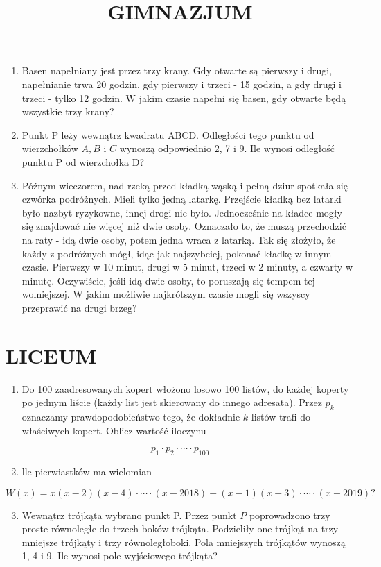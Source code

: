 \documentclass[10pt]{article}
\title{GIMNAZJUM }
\author{}
\date{}
\begin{document}
\maketitle
\begin{enumerate}
  \item Basen napełniany jest przez trzy krany. Gdy otwarte są pierwszy i drugi, napełnianie trwa 20 godzin, gdy pierwszy i trzeci - 15 godzin, a gdy drugi i trzeci - tylko 12 godzin. W jakim czasie napełni się basen, gdy otwarte będą wszystkie trzy krany?
  \item Punkt P leży wewnątrz kwadratu ABCD. Odległości tego punktu od wierzchołków \(A, B\) i \(C\) wynoszą odpowiednio 2, 7 i 9. Ile wynosi odległość punktu P od wierzchołka D?
  \item Późnym wieczorem, nad rzeką przed kładką wąską i pełną dziur spotkała się czwórka podróżnych. Mieli tylko jedną latarkę. Przejście kładką bez latarki było nazbyt ryzykowne, innej drogi nie było. Jednocześnie na kładce mogły się znajdować nie więcej niż dwie osoby. Oznaczało to, że muszą przechodzić na raty - idą dwie osoby, potem jedna wraca z latarką. Tak się złożyło, że każdy z podróżnych mógł, idąc jak najszybciej, pokonać kładkę w innym czasie. Pierwszy w 10 minut, drugi w 5 minut, trzeci w 2 minuty, a czwarty w minutę. Oczywiście, jeśli idą dwie osoby, to poruszają się tempem tej wolniejszej. W jakim możliwie najkrótszym czasie mogli się wszyscy przeprawić na drugi brzeg?
\end{enumerate}

\section*{LICEUM}
\begin{enumerate}
  \item Do 100 zaadresowanych kopert włożono losowo 100 listów, do każdej koperty po jednym liście (każdy list jest skierowany do innego adresata). Przez \(p_{k}\) oznaczamy prawdopodobieństwo tego, że dokładnie \(k\) listów trafi do właściwych kopert. Oblicz wartość iloczynu
\end{enumerate}

\[
p_{1} \cdot p_{2} \cdot \cdots \cdot p_{100}
\]

\begin{enumerate}
  \setcounter{enumi}{1}
  \item lle pierwiastków ma wielomian
\end{enumerate}

\[
W(x)=x(x-2)(x-4) \cdot \cdots \cdot(x-2018)+(x-1)(x-3) \cdot \cdots \cdot(x-2019) ?
\]

\begin{enumerate}
  \setcounter{enumi}{2}
  \item Wewnątrz trójkąta wybrano punkt P. Przez punkt \(P\) poprowadzono trzy proste równoległe do trzech boków trójkąta. Podzieliły one trójkąt na trzy mniejsze trójkąty i trzy równoległoboki. Pola mniejszych trójkątów wynoszą 1, 4 i 9. Ile wynosi pole wyjściowego trójkąta?
\end{enumerate}
\end{document}
